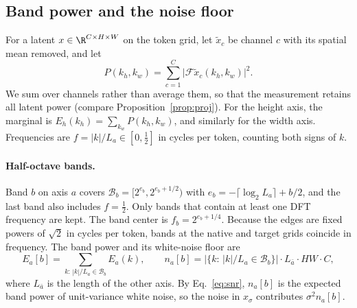 \subsection{Band power and the noise floor}
\label{sec:bandpower}
For a latent $x\in\R^{C\times H\times W}$ on the token grid, let $\tilde x_c$ be channel $c$ with its spatial mean removed, and let
\begin{equation}
P(k_h,k_w) = \sum_{c=1}^{C} \big|\mathcal F\tilde x_c(k_h,k_w)\big|^2 .
\label{eq:power}
\end{equation}
We sum over channels rather than average them, so that the measurement retains all latent power (compare Proposition~\ref{prop:proj}). For the height axis, the marginal is $E_h(k_h)=\sum_{k_w}P(k_h,k_w)$, and similarly for the width axis. Frequencies are $f=|k|/L_a\in[0,\tfrac12]$ in cycles per token, counting both signs of $k$.

\paragraph{Half-octave bands.}
Band $b$ on axis $a$ covers $\mathcal B_b=[2^{e_b},2^{e_b+1/2})$ with $e_b=-\lceil\log_2 L_a\rceil + b/2$, and the last band also includes $f=\tfrac12$. Only bands that contain at least one DFT frequency are kept. The band center is $f_b=2^{e_b+1/4}$. Because the edges are fixed powers of $\sqrt2$ in cycles per token, bands at the native and target grids coincide in frequency. The band power and its white-noise floor are
\begin{equation}
E_a[b] = \sum_{k:\,|k|/L_a\in\mathcal B_b} E_a(k), \qquad
n_a[b] = \big|\{k:\,|k|/L_a\in\mathcal B_b\}\big| \cdot L_{\bar a}\cdot HW\cdot C ,
\label{eq:bandpower}
\end{equation}
where $L_{\bar a}$ is the length of the other axis. By Eq.~\eqref{eq:snr}, $n_a[b]$ is the expected band power of unit-variance white noise, so the noise in $x_\sigma$ contributes $\sigma^2 n_a[b]$.

